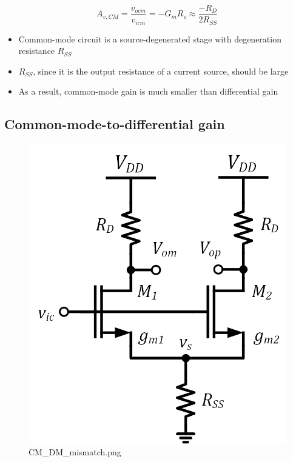 \documentclass[11pt]{article}
\providecommand{\tightlist}{%
      \setlength{\itemsep}{0pt}\setlength{\parskip}{0pt}}
\begin{document}
\begin{equation}
\boxed{ A_{v,CM} = \dfrac{v_{ocm}}{v_{icm}} = -G_mR_o \approx \dfrac{-R_D}{2R_{SS}} }
\end{equation}

    \begin{itemize}
\tightlist
\item
  Common-mode circuit is a source-degenerated stage with degeneration
  resistance \(R_{SS}\)
\item
  \(R_{SS}\), since it is the output resistance of a current source,
  should be large
\item
  As a result, common-mode gain is much smaller than differential gain
\end{itemize}

    \hypertarget{common-mode-to-differential-gain}{%
\subsection{Common-mode-to-differential
gain}\label{common-mode-to-differential-gain}}

    \begin{figure}
\centering
\includegraphics{CM_DM_mismatch.png}
\caption{CM\_DM\_mismatch.png}
\end{figure}
\end{document}
